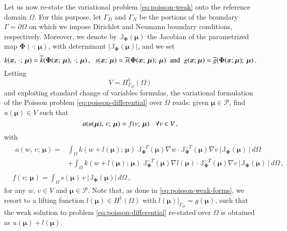 \documentclass{elsarticle}
\theoremstyle{theorem}
\theoremstyle{definition}
\theoremstyle{remark}
\theoremstyle{proposition}
\numberwithin{figure}{section}
\newcommand{\wt}[1]{\widetilde{#1}}
\newcommand{\bg}[1]{\boldsymbol{#1}}
\begin{document}
		Let us now re-state the variational problem \eqref{eq:poisson-weak} onto the reference domain $\Omega$. For this purpose, let $\Gamma_D$ and $\Gamma_N$ be the portions of the boundary $\Gamma = \partial \Omega$ on which we impose Dirichlet and Neumann boundary conditions, respectively. Moreover, we denote by $\mathbb{J}_{\bg{\Phi}}(\bg{\mu})$ the Jacobian of the parametrized map $\bg{\Phi}(\cdot; \, \bg{\mu})$, with determinant $\lvert \mathbb{J}_{\bg{\Phi}}(\bg{\mu}) \rvert$, and we set
		\begin{equation*}
			k(\bg{x}, \, \cdot; \, \bg{\mu}) = \wt{k}(\bg{\Phi}(\bg{x}; \, \bg{\mu}), \, \cdot; \, \bg{\mu}) \, , \hspace*{0.2cm} s(\bg{x}; \, \bg{\mu}) = \wt{s}(\bg{\Phi}(\bg{x}; \, \bg{\mu}); \, \bg{\mu}) \hspace*{0.2cm} \text{and} \hspace*{0.2cm} g(\bg{x}; \bg{\mu}) = \wt{g}(\bg{\Phi}(\bg{x}; \bg{\mu}); \, \bg{\mu}) \, .
		\end{equation*}
		Letting \[ V = H^1_{\Gamma_D}(\Omega) \] and exploiting standard change of variables formulas, the variational formulation of the Poisson problem \eqref{eq:poisson-differential} over $\Omega$ reads: given $\bg{\mu} \in \mathcal{P}$, find $u(\bg{\mu}) \in V$ such that
		\begin{equation}
			\label{eq:poisson-weak-reference}
			a(u(\bg{\mu}), \, v; \, \bg{\mu}) = f(v; \, \bg{\mu}) \hspace*{0.3cm} \forall v \in V \, ,
		\end{equation}
		with
		\begin{subequations}
			\label{eq:poisson-weak-forms-reference}
			\begin{align}
				\label{eq:poisson-weak-forms-reference-first}
				&
				\begin{aligned}
				a(w, \, v; \, \bg{\mu}) = & \int_{\Omega} k(w + l(\bg{\mu}); \, \bg{\mu}) ~ \mathbb{J}^{-T}_{\bg{\Phi}}(\bg{\mu}) \nabla w \cdot \mathbb{J}^{-T}_{\bg{\Phi}}(\bg{\mu}) \nabla v ~ \lvert \mathbb{J}_{\bg{\Phi}}(\bg{\mu}) ~ \rvert \, d \Omega \\
				& + \int_{\Omega} k(w + l(\bg{\mu}); \, \bg{\mu}) ~ \mathbb{J}^{-T}_{\bg{\Phi}}(\bg{\mu}) \nabla l(\bg{\mu}) \cdot \mathbb{J}^{-T}_{\bg{\Phi}}(\bg{\mu}) \nabla v ~ \lvert \mathbb{J}_{\bg{\Phi}}(\bg{\mu}) ~ \rvert \, d \Omega \, ,
				\end{aligned} \\
				\label{eq:poisson-weak-forms-reference-second}
				& f(v; \, \bg{\mu}) = \int_{\Omega} s(\bg{\mu}) ~ v ~ \lvert \mathbb{J}_{\bg{\Phi}}(\bg{\mu}) \rvert \, d \Omega \, ,  
			\end{align}
		\end{subequations}
		for any $w$, $v \in V$ and $\bg{\mu} \in \mathcal{P}$. Note that, as done in \eqref{eq:poisson-weak-forms}, we resort to a lifting function $l(\bg{\mu}) \in H^1(\Omega)$ with $l(\bg{\mu}) \big\rvert_{\Gamma_D} = g(\bg{\mu})$, such that the weak solution to problem \eqref{eq:poisson-differential} re-stated over $\Omega$ is obtained as $u(\bg{\mu}) + l(\bg{\mu})$.
		
\end{document}
